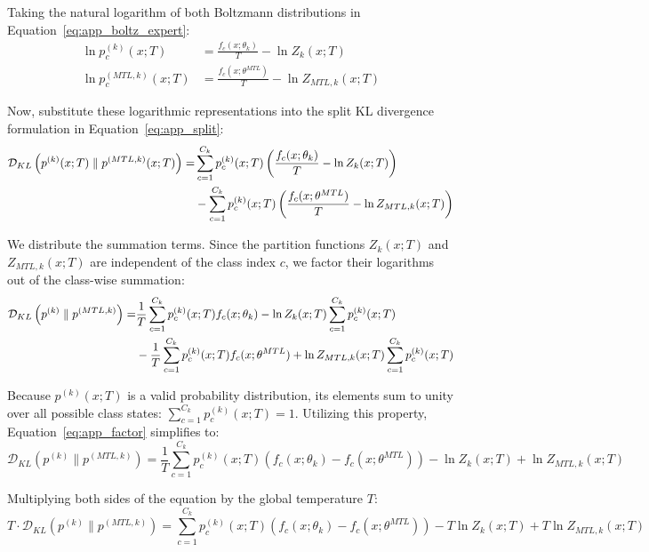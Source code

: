 \documentclass{article}
\theoremstyle{plain}
\theoremstyle{definition}
\theoremstyle{remark}
\begin{document}
Taking the natural logarithm of both Boltzmann distributions in Equation~\eqref{eq:app_boltz_expert}:
\begin{align}
\ln p_c^{(k)}(x; T) &= \frac{f_c(x; \theta_k)}{T} - \ln Z_k(x; T) \\
\ln p_c^{(MTL, k)}(x; T) &= \frac{f_c(x; \theta^{MTL})}{T} - \ln Z_{MTL, k}(x; T)
\end{align}

Now, substitute these logarithmic representations into the split KL divergence formulation in Equation~\eqref{eq:app_split}:
\begin{align}
\label{eq:app_substitute}
\mathcal{D}_{KL} \left( p^{(k)}(x; T) \parallel p^{(MTL, k)}(x; T) \right) = &\sum_{c=1}^{C_k} p_c^{(k)}(x; T) \left( \frac{f_c(x; \theta_k)}{T} - \ln Z_k(x; T) \right) \notag \\
&- \sum_{c=1}^{C_k} p_c^{(k)}(x; T) \left( \frac{f_c(x; \theta^{MTL})}{T} - \ln Z_{MTL, k}(x; T) \right)
\end{align}

We distribute the summation terms. Since the partition functions $Z_k(x; T)$ and $Z_{MTL, k}(x; T)$ are independent of the class index $c$, we factor their logarithms out of the class-wise summation:
\begin{align}
\label{eq:app_factor}
\mathcal{D}_{KL} \left( p^{(k)} \parallel p^{(MTL, k)} \right) = &\frac{1}{T} \sum_{c=1}^{C_k} p_c^{(k)}(x; T) f_c(x; \theta_k) - \ln Z_k(x; T) \sum_{c=1}^{C_k} p_c^{(k)}(x; T) \notag \\
&- \frac{1}{T} \sum_{c=1}^{C_k} p_c^{(k)}(x; T) f_c(x; \theta^{MTL}) + \ln Z_{MTL, k}(x; T) \sum_{c=1}^{C_k} p_c^{(k)}(x; T)
\end{align}

Because $p^{(k)}(x; T)$ is a valid probability distribution, its elements sum to unity over all possible class states: $\sum_{c=1}^{C_k} p_c^{(k)}(x; T) = 1$. Utilizing this property, Equation~\eqref{eq:app_factor} simplifies to:
\begin{equation}
\mathcal{D}_{KL} \left( p^{(k)} \parallel p^{(MTL, k)} \right) = \frac{1}{T} \sum_{c=1}^{C_k} p_c^{(k)}(x; T) \left( f_c(x; \theta_k) - f_c(x; \theta^{MTL}) \right) - \ln Z_k(x; T) + \ln Z_{MTL, k}(x; T)
\end{equation}

Multiplying both sides of the equation by the global temperature $T$:
\begin{equation}
\label{eq:app_temp_kl}
T \cdot \mathcal{D}_{KL} \left( p^{(k)} \parallel p^{(MTL, k)} \right) = \sum_{c=1}^{C_k} p_c^{(k)}(x; T) \left( f_c(x; \theta_k) - f_c(x; \theta^{MTL}) \right) - T \ln Z_k(x; T) + T \ln Z_{MTL, k}(x; T)
\end{equation}
\end{document}
